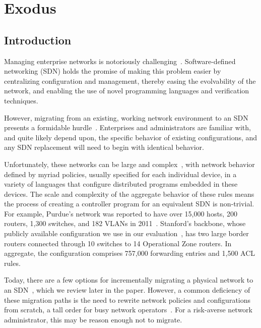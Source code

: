 
\chapter{Exodus}

\section{Introduction}
\label{sec:introduction}

Managing enterprise networks is notoriously challenging~\cite{
benson09unraveling,Casado07Ethane, casado06sane, kim11evolution,sung11systematic,
  yu11vpn}. 
Software-defined networking (SDN) holds the
promise of making this problem easier by centralizing configuration
and management, thereby easing the
evolvability of the network, and enabling the use of novel programming
languages and verification techniques.

However, migrating from an existing, working network environment to
an SDN presents a formidable hurdle~\cite{jain++:sigcomm13-google-sdn}.
Enterprises and administrators are familiar
with, and quite likely depend upon, the specific behavior of existing
configurations, and any SDN replacement will need to begin with identical
behavior.

Unfortunately, these networks can be large 
and complex~\cite{kim11evolution,levin13panopticonTR,zeng12test}, with network behavior
defined by myriad policies, 
usually specified for each individual device, in a variety of
languages that configure distributed programs embedded in these
devices. 
The scale and complexity of the aggregate
behavior of these rules means the process of creating a
controller program for an equivalent SDN is non-trivial.
For example, Purdue's network was reported to
have over 15,000 hosts, 200 routers, 1,300 switches, and 182
VLANs in 2011~\cite{sung11systematic}. 
%
Stanford's backbone, whose publicly available configuration we use in
our evaluation~\cite{zeng12test}, has two
large border routers connected through 10 switches to 14 Operational Zone
routers. In aggregate, the configuration comprises 757,000 forwarding entries
and 1,500 ACL rules. 


Today, there are a few options for incrementally migrating a physical
network to an SDN~\cite{Casado07Ethane, Casado:hotsdn2012-fabric, levin13panopticonTR}, 
which we review later in the paper. However, a common deficiency
of these migration paths is the need to rewrite network policies
and configurations from scratch, a tall order for busy network operators~\cite{Barrett04fieldstudies}.
For a risk-averse network administrator,
this may be reason enough not to migrate. 


